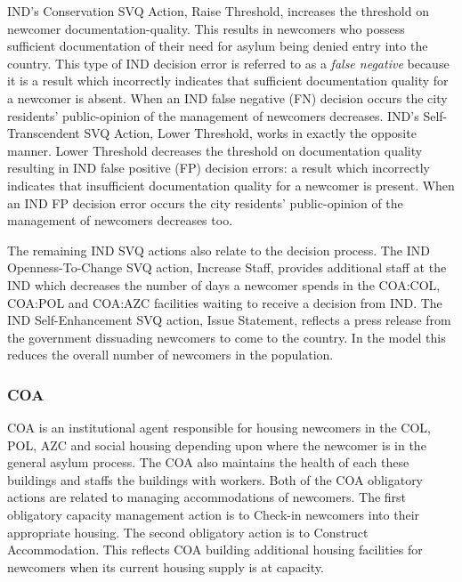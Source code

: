 \documentclass{scspaperproc}
\theoremstyle{scsthe}
\begin{document}
IND's Conservation SVQ Action, Raise Threshold, increases the threshold on newcomer documentation-quality. This results in newcomers who possess sufficient documentation of their need for asylum being denied entry into the country. This type of IND decision error is referred to as a \emph{false negative} because it is a result which incorrectly indicates that sufficient documentation quality for a newcomer is absent. When an IND false negative (FN) decision occurs the city residents' public-opinion of the management of newcomers decreases. IND's Self-Transcendent SVQ Action, Lower Threshold, works in exactly the opposite manner. Lower Threshold decreases the threshold on documentation quality resulting in IND false positive (FP) decision errors: a result which incorrectly indicates that insufficient documentation quality for a newcomer is present. When an IND FP decision error occurs the city residents' public-opinion of the management of newcomers decreases too.

The remaining IND SVQ actions also relate to the decision process. The IND Openness-To-Change SVQ action, Increase Staff, provides additional staff at the IND which decreases the number of days a newcomer spends in the COA:COL, COA:POL and COA:AZC facilities waiting to receive a decision from IND. The IND Self-Enhancement SVQ action, Issue Statement, reflects a press release from the government dissuading newcomers to come to the country. In the model this reduces the overall number of newcomers in the population.

\subsubsection{COA}
COA is an institutional agent responsible for housing newcomers in the COL, POL, AZC and social housing depending upon where the newcomer is in the general asylum process. The COA also maintains the health of each these buildings and staffs the buildings with workers. Both of the COA obligatory actions are related to managing accommodations of newcomers. The first obligatory capacity management action is to Check-in newcomers into their appropriate housing. The second obligatory action is to Construct Accommodation. This reflects COA building additional housing facilities for newcomers when its current housing supply is at capacity. 
\end{document}
